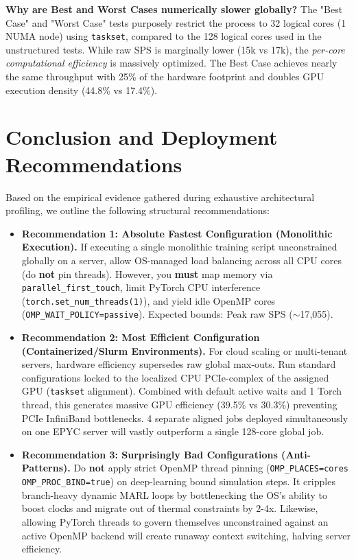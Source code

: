 \documentclass[11pt,a4paper]{article}
\begin{document}
\textbf{Why are Best and Worst Cases numerically slower globally?} 
The "Best Case" and "Worst Case" tests purposely restrict the process to 32 logical cores (1 NUMA node) using \texttt{taskset}, compared to the 128 logical cores used in the unstructured tests. While raw SPS is marginally lower (15k vs 17k), the \textit{per-core computational efficiency} is massively optimized. The Best Case achieves nearly the same throughput with 25\% of the hardware footprint and doubles GPU execution density (44.8\% vs 17.4\%). 

\section{Conclusion and Deployment Recommendations}

Based on the empirical evidence gathered during exhaustive architectural profiling, we outline the following structural recommendations:

\begin{itemize}
    \item \textbf{Recommendation 1: Absolute Fastest Configuration (Monolithic Execution).} 
    If executing a single monolithic training script unconstrained globally on a server, allow OS-managed load balancing across all CPU cores (do \textbf{not} pin threads). However, you \textbf{must} map memory via \texttt{parallel\_first\_touch}, limit PyTorch CPU interference (\texttt{torch.set\_num\_threads(1)}), and yield idle OpenMP cores (\texttt{OMP\_WAIT\_POLICY=passive}). Expected bounds: Peak raw SPS ($\sim$17,055).
    
    \item \textbf{Recommendation 2: Most Efficient Configuration (Containerized/Slurm Environments).} 
    For cloud scaling or multi-tenant servers, hardware efficiency supersedes raw global max-outs. Run standard configurations locked to the localized CPU PCIe-complex of the assigned GPU (\texttt{taskset} alignment). Combined with default active waits and 1 Torch thread, this generates massive GPU efficiency (39.5\% vs 30.3\%) preventing PCIe InfiniBand bottlenecks. 4 separate aligned jobs deployed simultaneously on one EPYC server will vastly outperform a single 128-core global job.
    
    \item \textbf{Recommendation 3: Surprisingly Bad Configurations (Anti-Patterns).} 
    Do \textbf{not} apply strict OpenMP thread pinning (\texttt{OMP\_PLACES=cores OMP\_PROC\_BIND=true}) on deep-learning bound simulation steps. It cripples branch-heavy dynamic MARL loops by bottlenecking the OS's ability to boost clocks and migrate out of thermal constraints by 2-4x. Likewise, allowing PyTorch threads to govern themselves unconstrained against an active OpenMP backend will create runaway context switching, halving server efficiency.
\end{itemize}
\end{document}
